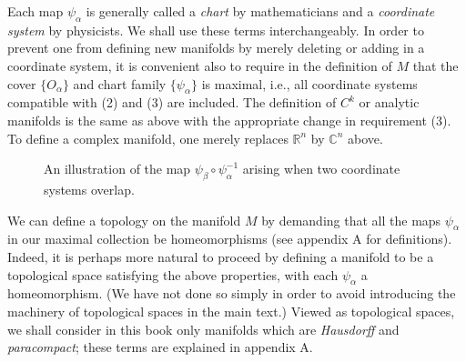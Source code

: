 Each map $\psi_\alpha$ is generally called a \emph{chart} by mathematicians and a \emph{coordinate system} by physicists. We shall use these terms interchangeably. In order to prevent one from defining new manifolds by merely deleting or adding in a coordinate system, it is convenient also to require in the definition of $M$ that the cover $\{O_\alpha\}$ and chart family $\{\psi_\alpha\}$ is maximal, i.e., all coordinate systems compatible with (2) and (3) are included. The definition of $C^k$ or analytic manifolds is the same as above with the appropriate change in requirement (3). To define a complex manifold, one merely replaces $\mathbb{R}^n$ by $\mathbb{C}^n$ above.

\begin{figure}[!ht]
    \centering
    \caption{An illustration of the map $\psi_\beta\circ\psi_\alpha^{-1}$ arising when two coordinate systems overlap.}
    \label{2.1}
\end{figure}
 
We can define a topology on the manifold $M$ by demanding that all the maps $\psi_\alpha$ in our maximal collection be homeomorphisms (see appendix A for definitions). Indeed, it is perhaps more natural to proceed by defining a manifold to be a topological space satisfying the above properties, with each $\psi_\alpha$ a homeomorphism. (We have not done so simply in order to avoid introducing the machinery of topological spaces in the main text.) Viewed as topological spaces, we shall consider in this book only manifolds which are \emph{Hausdorff} and \emph{paracompact}; these terms are explained in appendix A.

